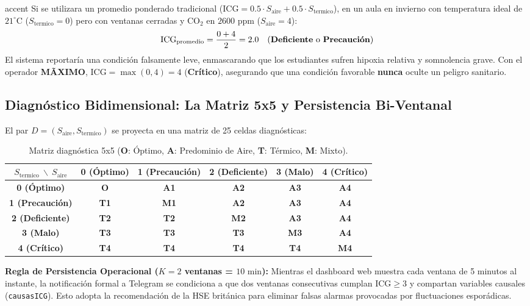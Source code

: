 \documentclass[11pt,a4paper]{article}
\begin{document}
\begin{calloutbox}[title=Demostración del Efecto de Enmascaramiento (Masking Effect)]{accent}
Si se utilizara un promedio ponderado tradicional ($\text{ICG} = 0.5 \cdot S_{\text{aire}} + 0.5 \cdot S_{\text{termico}}$), en un aula en invierno con temperatura ideal de $21^\circ\text{C}$ ($S_{\text{termico}} = 0$) pero con ventanas cerradas y $\text{CO}_2$ en $2600\text{ ppm}$ ($S_{\text{aire}} = 4$):
\[ \text{ICG}_{\text{promedio}} = \frac{0 + 4}{2} = 2.0\quad\text{(\textbf{Deficiente} o \textbf{Precaución})} \]
El sistema reportaría una condición falsamente leve, enmascarando que los estudiantes sufren hipoxia relativa y somnolencia grave. Con el operador \textbf{MÃXIMO}, $\text{ICG} = \max(0, 4) = 4$ (\textbf{Crítico}), asegurando que una condición favorable \textbf{nunca} oculte un peligro sanitario.
\end{calloutbox}

\subsection{Diagnóstico Bidimensional: La Matriz 5x5 y Persistencia Bi-Ventanal}
El par $D = (S_{\text{aire}}, S_{\text{termico}})$ se proyecta en una matriz de 25 celdas diagnósticas:

\begin{table}[H]
\centering
\small
\renewcommand{\arraystretch}{1.15}
\begin{tabular}{c | c c c c c}
\toprule
$S_{\text{termico}} \ \backslash \ S_{\text{aire}}$ & \textbf{0 (Óptimo)} & \textbf{1 (Precaución)} & \textbf{2 (Deficiente)} & \textbf{3 (Malo)} & \textbf{4 (Crítico)} \\
\midrule
\textbf{0 (Óptimo)}     & \textbf{O}   & \textbf{A1} & \textbf{A2} & \textbf{A3} & \textbf{A4} \\
\textbf{1 (Precaución)} & \textbf{T1}  & \textbf{M1} & \textbf{A2} & \textbf{A3} & \textbf{A4} \\
\textbf{2 (Deficiente)} & \textbf{T2}  & \textbf{T2} & \textbf{M2} & \textbf{A3} & \textbf{A4} \\
\textbf{3 (Malo)}       & \textbf{T3}  & \textbf{T3} & \textbf{T3} & \textbf{M3} & \textbf{A4} \\
\textbf{4 (Crítico)}    & \textbf{T4}  & \textbf{T4} & \textbf{T4} & \textbf{T4} & \textbf{M4} \\
\bottomrule
\end{tabular}
\caption{Matriz diagnóstica 5x5 (\textbf{O}: Óptimo, \textbf{A}: Predominio de Aire, \textbf{T}: Térmico, \textbf{M}: Mixto).}
\label{tab:matriz_5x5}
\end{table}

\textbf{Regla de Persistencia Operacional ($K = 2$ ventanas = $10\text{ min}$):} Mientras el dashboard web muestra cada ventana de 5 minutos al instante, la notificación formal a Telegram se condiciona a que dos ventanas consecutivas cumplan $\text{ICG} \ge 3$ y compartan variables causales (\texttt{causasICG}). Esto adopta la recomendación de la HSE británica para eliminar falsas alarmas provocadas por fluctuaciones esporádicas.
\end{document}
